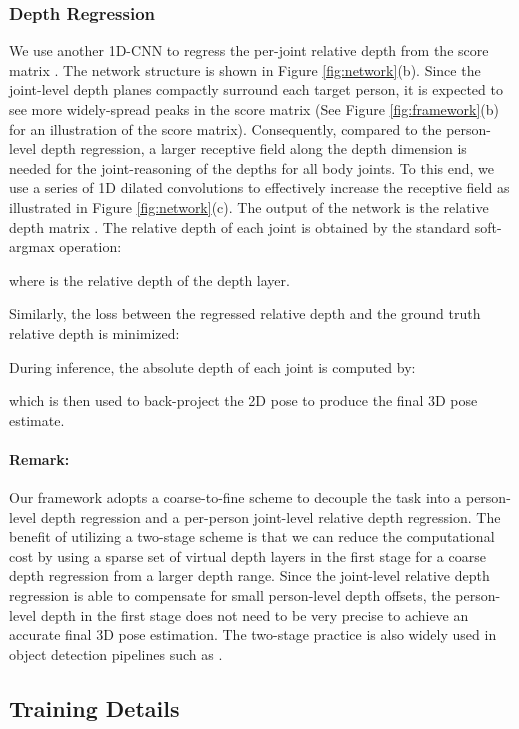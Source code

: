 \documentclass[final]{cvpr}
\begin{document}
\subsubsection{Depth Regression}

We use another 1D-CNN to regress the per-joint relative depth from the score matrix .
The network structure is shown in Figure \ref{fig:network}(b).
Since the joint-level depth planes compactly surround each target person, it is expected to see more widely-spread peaks in the score matrix (See Figure \ref{fig:framework}(b) for an illustration of the score matrix).
Consequently, compared to the person-level depth regression, a larger receptive field along the depth dimension is needed for the joint-reasoning of the depths for all body joints.
To this end, we use a series of 1D dilated convolutions to effectively increase the receptive field as illustrated in Figure \ref{fig:network}(c).
The output of the network is the relative depth matrix .
The relative depth of each joint is obtained by the standard soft-argmax operation:

where  is the relative depth of the  depth layer.

Similarly, the  loss between the regressed relative depth  and the ground truth relative depth  is minimized:

During inference, the absolute depth of each joint is computed by:

which is then used to back-project the 2D pose to produce the final 3D pose estimate.

\vspace{-3mm} \paragraph{Remark:}
Our framework adopts a coarse-to-fine scheme to decouple the task into a person-level depth regression and a per-person joint-level relative depth regression.
The benefit of utilizing a two-stage scheme is that we can reduce the computational cost by using a sparse set of virtual depth layers in the first stage for a coarse depth regression from a larger depth range.
Since the joint-level relative depth regression is able to compensate for small person-level depth offsets, the person-level depth in the first stage does not need to be very precise 
to achieve an accurate final 3D pose estimation.
The two-stage practice is also widely used in object detection pipelines such as \cite{ren2015faster,he2017mask}.

\subsection{Training Details}
\end{document}
